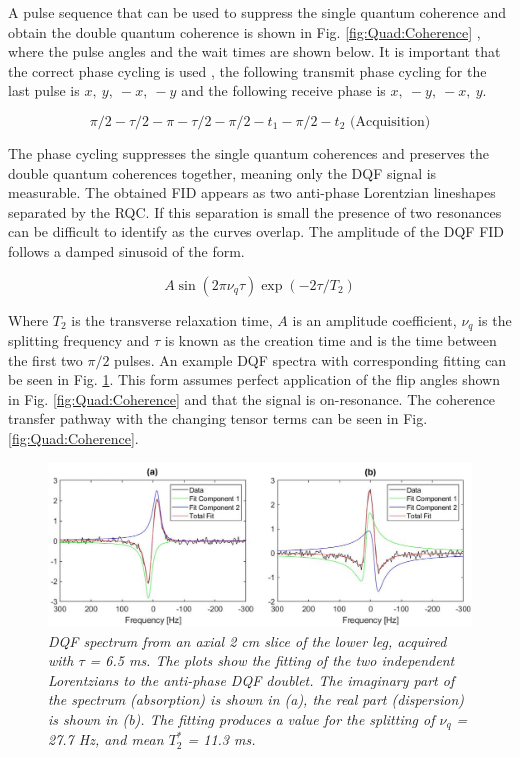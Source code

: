 A pulse sequence that can be used to suppress the single quantum coherence and obtain the double quantum coherence is shown in Fig. \ref{fig:Quad:Coherence} \cite{Sharf1995DetectionNMR-Spectroscopy}, where the pulse angles and the wait times are shown below. It is important that the correct phase cycling is used \cite{Bodenhausen1984SelectionExperiments}, the following transmit phase cycling for the last pulse is $x,\:y,\:-x,\:-y$ and the following receive phase is $x,\:-y,\:-x,\:y$. 

\begin{equation}
    \pi/2-\tau/2-\pi-\tau/2-\pi/2-t_1-\pi/2-t_2 \textrm{ (Acquisition)}
    \label{eqn:Quad:Pulse}
\end{equation}

The phase cycling suppresses the single quantum coherences and preserves the double quantum coherences together, meaning only the \ac{DQF} signal is measurable. The obtained FID appears as two anti-phase Lorentzian lineshapes separated by the \ac{RQC}. If this separation is small the presence of two resonances can be difficult to identify as the curves overlap. The amplitude of the \ac{DQF} FID follows a damped sinusoid of the form. 

\begin{equation}
    A\sin(2\pi\nu_q\tau)\exp(-2\tau/T_2)
    \label{eqn:Quad:Amplitude}
\end{equation}

Where $T_2$ is the transverse relaxation time, $A$ is an amplitude coefficient, $\nu_q$ is the splitting frequency and $\tau$ is known as the creation time and is the time between the first two $\pi/2$ pulses. An example \ac{DQF} spectra with corresponding fitting can be seen in Fig. \ref{fig:Quad:Ex_DQF}. This form assumes perfect application of the flip angles shown in Fig. \ref{fig:Quad:Coherence} and that the signal is on-resonance. The coherence transfer pathway with the changing tensor terms can be seen in Fig. \ref{fig:Quad:Coherence}.

\begin{figure}
    \centering
    \includegraphics[width=1\textwidth]{Figures/Quad/Example_DQF.png}
    \caption{\textit{\ac{DQF} spectrum from an axial 2 cm slice of the lower leg, acquired with $\tau$ = 6.5 ms. The plots show the fitting of the two independent Lorentzians to the anti-phase \ac{DQF} doublet. The imaginary part of the spectrum (absorption) is shown in (a), the real part (dispersion) is shown in (b). The fitting produces a value for the splitting of $\nu_q$ = 27.7 Hz, and mean $T_2^*$ = 11.3 ms.}}
    \label{fig:Quad:Ex_DQF}
\end{figure}

